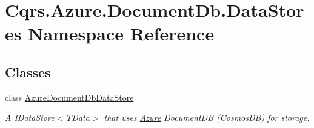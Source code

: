 \hypertarget{namespaceCqrs_1_1Azure_1_1DocumentDb_1_1DataStores}{}\section{Cqrs.\+Azure.\+Document\+Db.\+Data\+Stores Namespace Reference}
\label{namespaceCqrs_1_1Azure_1_1DocumentDb_1_1DataStores}
\subsection*{Classes}
\begin{DoxyCompactItemize}
\item 
class \hyperlink{classCqrs_1_1Azure_1_1DocumentDb_1_1DataStores_1_1AzureDocumentDbDataStore}{Azure\+Document\+Db\+Data\+Store}
\begin{DoxyCompactList}\small\item\em A I\+Data\+Store$<$\+T\+Data$>$ that uses \hyperlink{namespaceCqrs_1_1Azure}{Azure} Document\+DB (Cosmos\+DB) for storage. \end{DoxyCompactList}\end{DoxyCompactItemize}
